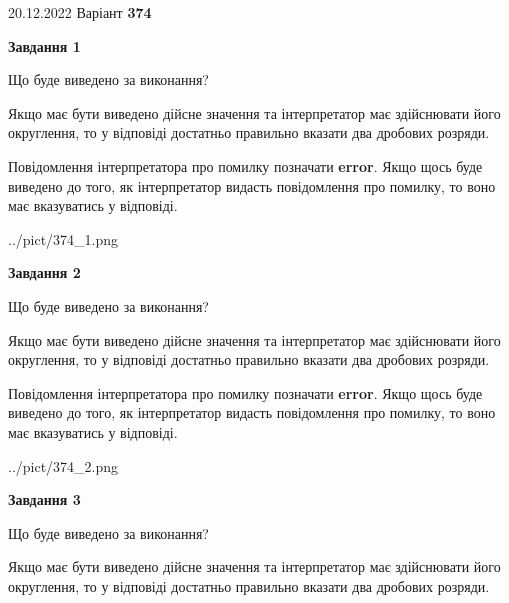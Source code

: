 \documentclass[12pt, ukrainian]{article}
\begin{document}
{20.12.2022 Варіант \No \textbf { 374 }\par}
{
\begin {Large}

{\begin {center}\textbf{Завдання 1}\end {center}}\par
Що буде виведено за виконання? \par

Якщо має бути виведено дійсне значення та інтерпретатор має здійснювати його округлення, 
то у відповіді достатньо правильно вказати два дробових розряди.

Повідомлення інтерпретатора про помилку позначати \textbf{error}.
Якщо щось буде виведено до того, як інтерпретатор видасть повідомлення про помилку, 
то воно має вказуватись у відповіді. \par

\begin{center}
	{../pict/374_1.png}
\end{center}
\newpage

{\begin {center}\textbf{Завдання 2}\end {center}}\par
Що буде виведено за виконання? \par

Якщо має бути виведено дійсне значення та інтерпретатор має здійснювати його округлення, 
то у відповіді достатньо правильно вказати два дробових розряди.

Повідомлення інтерпретатора про помилку позначати \textbf{error}.
Якщо щось буде виведено до того, як інтерпретатор видасть повідомлення про помилку, 
то воно має вказуватись у відповіді. \par

\begin{center}
	{../pict/374_2.png}
\end{center}
\newpage

{\begin {center}\textbf{Завдання 3}\end {center}}\par
Що буде виведено за виконання? \par

Якщо має бути виведено дійсне значення та інтерпретатор має здійснювати його округлення, 
то у відповіді достатньо правильно вказати два дробових розряди.


\end{Large}}
\end{document}
